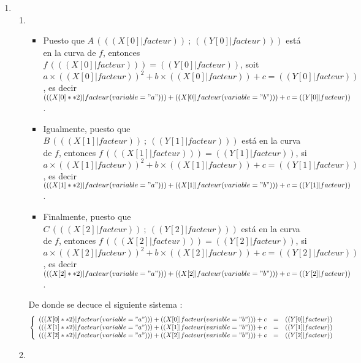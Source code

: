 \exercice*
\begin{enumerate}

  \item
    \begin{enumerate}
      \item
        \begin{itemize}
          \item Puesto que $A\,( (( X[0]|facteur ))~;~(( Y[0]|facteur )) )$ está en la curva de $f$, entonces $f\,( (( X[0]|facteur )) )=(( Y[0]|facteur ))$, soit
            $a \times (( X[0]|facteur ))^2+b\times (( X[0]|facteur ))+c=(( Y[0]|facteur ))$,
            es decir $(( (X[0]**2)|facteur(variable="a") )) + (( X[0]|facteur(variable="b") )) + c = (( Y[0]|facteur ))$.
          \item Igualmente, puesto que $B\,( (( X[1]|facteur ))~;~(( Y[1]|facteur )) )$ está en la curva de $f$, entonces $f\,( (( X[1]|facteur )) )=(( Y[1]|facteur ))$, si
            $a \times (( X[1]|facteur ))^2+b\times (( X[1]|facteur ))+c=(( Y[1]|facteur ))$,
            es decir $(( (X[1]**2)|facteur(variable="a") )) + (( X[1]|facteur(variable="b") )) + c = (( Y[1]|facteur ))$.
          \item Finalmente, puesto que $C\,( (( X[2]|facteur ))~;~(( Y[2]|facteur )) )$ está en la curva de $f$, entonces $f\,( (( X[2]|facteur )) )=(( Y[2]|facteur ))$, si
            $a \times (( X[2]|facteur ))^2+b\times (( X[2]|facteur ))+c=(( Y[2]|facteur ))$,
            es decir $(( (X[2]**2)|facteur(variable="a") )) + (( X[2]|facteur(variable="b") )) + c = (( Y[2]|facteur ))$.
        \end{itemize}

        De donde se decuce el siguiente sistema :
        \[ \left\{\begin{array}{rcl}
            (( (X[0]**2)|facteur(variable="a") )) + (( X[0]|facteur(variable="b") )) + c &=& (( Y[0]|facteur )) \\
            (( (X[1]**2)|facteur(variable="a") )) + (( X[1]|facteur(variable="b") )) + c &=& (( Y[1]|facteur )) \\
            (( (X[2]**2)|facteur(variable="a") )) + (( X[2]|facteur(variable="b") )) + c &=& (( Y[2]|facteur )) \\
        \end{array}\right.\]
      \item


\end{enumerate}
\end{enumerate}
